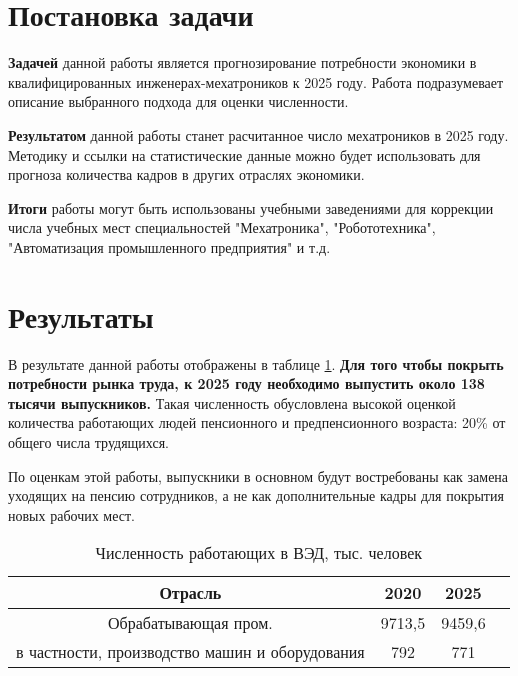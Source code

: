 \section{Постановка задачи}

\textbf{Задачей} данной работы является прогнозирование потребности экономики в квалифицированных инженерах-мехатроников к 2025 году. 
Работа подразумевает описание выбранного подхода для оценки численности.

\textbf{Результатом} данной работы станет расчитанное число мехатроников в 2025 году. Методику и ссылки на
статистические данные можно будет использовать для прогноза количества кадров в других отраслях экономики. 

\textbf{Итоги} работы могут быть использованы учебными заведениями для коррекции числа учебных мест
специальностей "Мехатроника", "Робототехника", "Автоматизация промышленного предприятия" и т.д.

\clearpage

\section{Результаты}
	В результате данной работы отображены в таблице \ref{res}. \textbf{Для того чтобы покрыть потребности рынка труда, к 2025 году необходимо выпустить около 138 тысячи выпускников.} Такая численность 
	обусловлена высокой оценкой количества работающих людей пенсионного и предпенсионного возраста: 20\% от общего числа трудящихся.
	\par
	По оценкам этой работы, выпускники в основном будут востребованы как замена уходящих на пенсию сотрудников, а не как дополнительные кадры для покрытия новых рабочих мест.
	
	\begin{table}
		\begin{center}
			\caption{Численность работающих в ВЭД, тыс. человек}\label{res}
			\begin{tabular}{ |c|c|c|c| } 
				\hline
				Отрасль                                        & 2020   & 2025   \\
				\hline
				Обрабатывающая пром.                           & 9713,5 & 9459,6 \\
				\hline
				в частности, производство машин и оборудования & 792    & 771    \\
				\hline
			\end{tabular}
		\end{center}
	\end{table}
\clearpage
